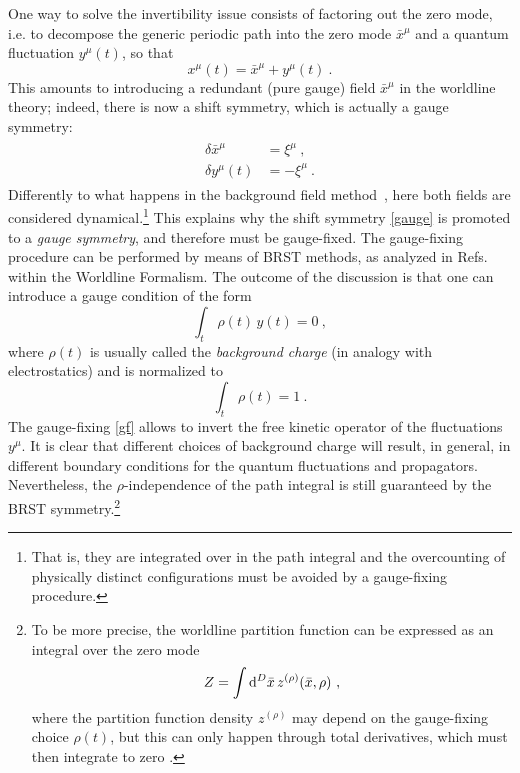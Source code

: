 \documentclass[12pt,a4paper]{article}
\numberwithin{equation}{section}
\numberwithin{equation}{section}
\begin{document}
One way to solve the invertibility issue consists of factoring out the zero mode, i.e. to decompose the generic periodic path into the zero mode $\bar{x}^\mu$ and a quantum fluctuation $y^\mu(t)$, so that
\begin{equation} \label{fact}
x^\mu(t)=\bar{x}^\mu+y^\mu(t)\ .
\end{equation}
This amounts to introducing a redundant (pure gauge) field $\bar{x}^\mu$ in the worldline theory; indeed, there is now a shift symmetry, which is actually a gauge symmetry:
\begin{align}
\begin{split} \label{gauge}
\delta \bar{x}^\mu &=\xi^\mu\ , \\
\delta y^\mu(t)&=-\xi^\mu\ .
\end{split}
\end{align}
Differently to what happens in the background field method~\cite{Abbott:1980hw}, here both fields are considered dynamical.\footnote{That is, they are integrated over in the path integral and the overcounting of physically distinct configurations must be avoided by a gauge-fixing procedure.} This explains why the shift symmetry \eqref{gauge} is promoted to a \emph{gauge symmetry}, and therefore must be gauge-fixed. The gauge-fixing procedure can be performed by means of BRST methods, as analyzed in Refs.~\cite{Bastianelli:2003bg, Bastianelli:2009eh, Corradini:2018lov, Fecit:2023kah} within the Worldline Formalism. The outcome of the discussion is that one can introduce a gauge condition of the form
\begin{equation} \label{gf}
\int_t \, \rho(t)\, y(t)=0\ ,
\end{equation}
where $\rho(t)$ is usually called the \emph{background charge} (in analogy with electrostatics) and is normalized to
\begin{equation}
\int_t \, \rho(t)=1\ .
\end{equation}
The gauge-fixing \eqref{gf} allows to invert the free kinetic operator of the fluctuations $y^\mu$. It is clear that different choices of background charge will result, in general, in different boundary conditions for the quantum fluctuations and propagators. Nevertheless, the $\rho$-independence of the path integral is still guaranteed by the BRST symmetry.\footnote{To be more precise, the worldline partition function can be expressed as an integral over the zero mode
\begin{equation*}
 Z=\int {\rm d}^D\bar{x} \, z^{(\rho)}(\bar{x},\rho)\ ,
\end{equation*} 
where the partition function density $z^{(\rho)}$ may depend on the gauge-fixing choice $\rho(t)$, but this can only happen through total derivatives, which must then integrate to zero \cite{Bastianelli:2003bg}.}
\end{document}
